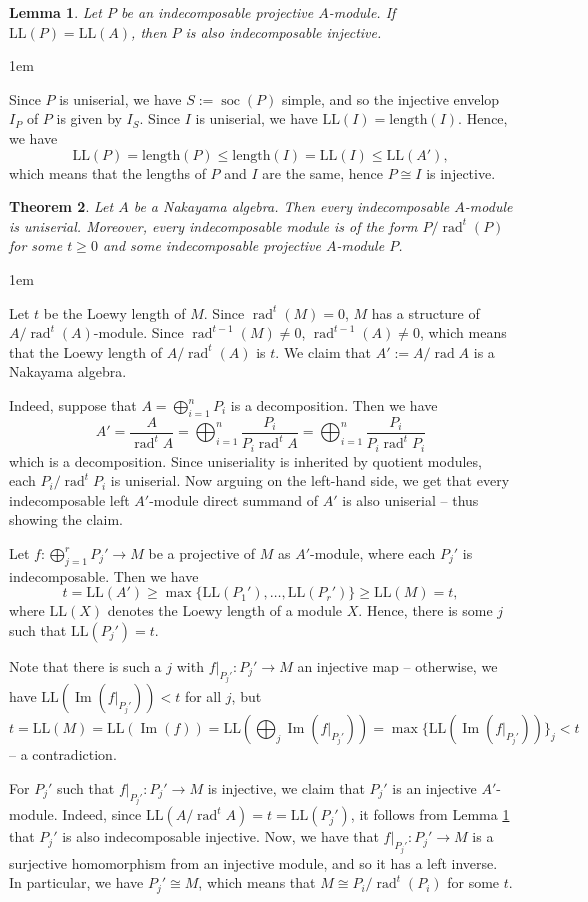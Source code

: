 \documentclass[11pt,a4paper]{article}
\makeatletter
\numberwithin{equation}{section}
\renewenvironment{proof}[1][\proofname]{\par
    \pushQED{\qed}%
    \normalfont \topsep0\p@\@plus6\p@ \labelsep1em\relax
    \trivlist
    \item[\hskip\labelsep\indent
        \bfseries #1]\ignorespaces
    \mbox{}
}{
    \popQED\endtrivlist\@endpefalse
}
\theoremstyle{all}
\newtheorem{theorem}{Theorem}[section]
\newtheorem{lemma}[theorem]{Lemma}
\theoremstyle{remark}
\newcommand{\soc}{\operatorname{soc}\nolimits}
\newcommand{\rad}{\operatorname{rad}\nolimits}
\renewcommand{\Im}{\operatorname{Im}\nolimits}
\newcommand{\LL}{\mathrm{LL}}
\makeatother
\begin{document}
\begin{lemma}\label{lem:max uni proj/Naka is inj}
Let $P$ be an indecomposable projective $A$-module.
If $\mathrm{LL}(P)=\mathrm{LL}(A)$, then $P$ is also indecomposable injective.
\end{lemma}
\begin{proof}
Since $P$ is uniserial, we have $S:=\soc(P)$ simple, and so the injective envelop $I_P$ of $P$ is given by $I_S$.  Since $I$ is uniserial, we have $\LL(I)=\mathrm{length}(I)$.  Hence, we have
\[
\LL(P) = \mathrm{length}(P) \le \mathrm{length}(I) = \LL(I) \le \LL(A'),\]
which means that the lengths of $P$ and $I$ are the same, hence $P\cong I$ is injective.
\end{proof}

\begin{theorem}
Let $A$ be a Nakayama algebra.
Then every indecomposable $A$-module is uniserial.  Moreover, every indecomposable module is of the form $P/\rad^t(P)$ for some $t\ge 0$ and some indecomposable projective $A$-module $P$.
\end{theorem}
\begin{proof}
Let $t$ be the Loewy length of $M$.
Since $\rad^t(M)=0$, $M$ has a structure of $A/\rad^t(A)$-module.
Since $\rad^{t-1}(M)\neq 0$, $\rad^{t-1}(A)\neq 0$, which means that the Loewy length of $A/\rad^t(A)$ is $t$.  We claim that $A':=A/\rad A$ is a Nakayama algebra.

Indeed, suppose that $A=\bigoplus_{i=1}^n P_i$ is a decomposition.  Then we have
\[
A' = \frac{A}{\rad^t A} = \bigoplus_{i=1}^n \frac{P_i}{P_i \rad^t A} = \bigoplus_{i=1}^n \frac{P_i}{P_i \rad^t P_i}
\]
which is a decomposition.
Since uniseriality is inherited by quotient modules, each $P_i/\rad^tP_i$ is uniserial.  Now arguing on the left-hand side, we get that every indecomposable left $A'$-module direct summand of $A'$ is also uniserial -- thus showing the claim.

Let $f:\bigoplus_{j=1}^r P_j' \to M$ be a projective of $M$ as $A'$-module, where each $P_j'$ is indecomposable.
Then we have
\[
t = \mathrm{LL}(A') \ge \max\{\mathrm{LL}(P_1'), \ldots, \mathrm{LL}(P_r') \} \ge \mathrm{LL}(M) = t,
\]
where $\mathrm{LL}(X)$ denotes the Loewy length of a module $X$.
Hence, there is some $j$ such that $\mathrm{LL}(P_j') = t$.

Note that there is such a $j$ with $f|_{P_j'}:P_j'\to M$ an injective map -- otherwise, we have $\mathrm{LL}(\Im(f|_{P_j'}))< t$ for all $j$, but
\[
t=\mathrm{LL}(M) = \mathrm{LL}(\Im(f)) = \mathrm{LL}(\bigoplus_{j} \Im(f|_{P_j'})) = \max\{\mathrm{LL}(\Im(f|_{P_j'}))\}_j < t
\]
-- a contradiction.

For $P_j'$ such that $f|_{P_j'}:P_j'\to M$ is injective, we claim that $P_j'$ is an injective $A'$-module.  Indeed, 
since $\mathrm{LL}(A/\rad^t A) = t = \mathrm{LL}(P_j')$, it follows from Lemma \ref{lem:max uni proj/Naka is inj} that $P_j'$ is also indecomposable injective.  Now, we have that $f|_{P_j'}:P_j'\to M$ is a surjective homomorphism from an injective module, and so it has a left inverse.  In particular, we have $P_j'\cong M$, which means that $M\cong P_i/\rad^t(P_i)$ for some $t$.
\end{proof}
\end{document}
